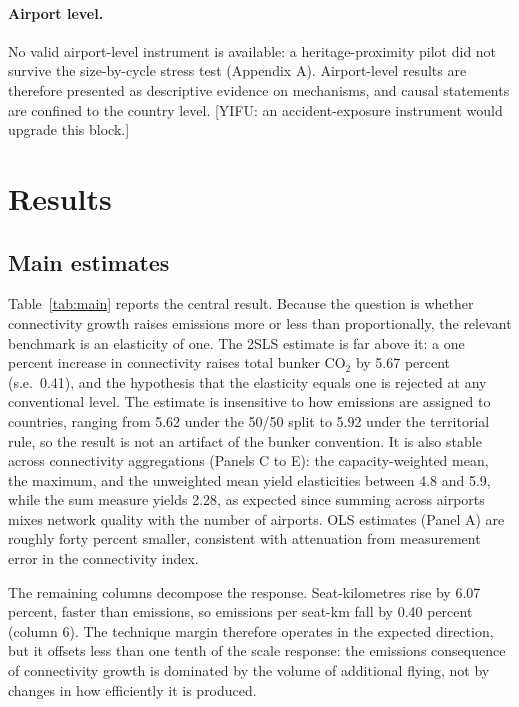 \documentclass[12pt]{article}
\begin{document}
\paragraph{Airport level.} No valid airport-level instrument is available: a
heritage-proximity pilot did not survive the size-by-cycle stress test
(Appendix A). Airport-level results are therefore presented as descriptive
evidence on mechanisms, and causal statements are confined to the country
level. [YIFU: an accident-exposure instrument would upgrade this block.]

\section{Results}
\subsection{Main estimates}
Table~\ref{tab:main} reports the central result. Because the question is
whether connectivity growth raises emissions more or less than
proportionally, the relevant benchmark is an elasticity of one. The 2SLS
estimate is far above it: a one percent increase in connectivity raises
total bunker CO$_2$ by 5.67 percent (s.e.\ 0.41), and the hypothesis that
the elasticity equals one is rejected at any conventional level. The
estimate is insensitive to how emissions are assigned to countries, ranging
from 5.62 under the 50/50 split to 5.92 under the territorial rule, so the
result is not an artifact of the bunker convention. It is also stable across
connectivity aggregations (Panels C to E): the capacity-weighted mean, the
maximum, and the unweighted mean yield elasticities between 4.8 and 5.9,
while the sum measure yields 2.28, as expected since summing across airports
mixes network quality with the number of airports. OLS estimates (Panel A)
are roughly forty percent smaller, consistent with attenuation from
measurement error in the connectivity index.

The remaining columns decompose the response. Seat-kilometres rise by 6.07
percent, faster than emissions, so emissions per seat-km fall by 0.40
percent (column 6). The technique margin therefore operates in the expected
direction, but it offsets less than one tenth of the scale response: the
emissions consequence of connectivity growth is dominated by the volume of
additional flying, not by changes in how efficiently it is produced.
\end{document}
